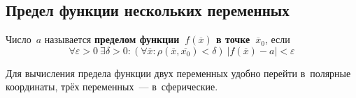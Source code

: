 \subsection{Предел функции нескольких переменных}
Число~$a$ называется \textbf{пределом функции~$f(\overline x)$ в точке~$\overline x_0$}, если
\begin{equation*}
\forall \varepsilon > 0 \ \exists \delta > 0 \colon (\forall \overline x \colon \rho(\overline x, \overline{x_0}) < \delta) \ |f(\overline x) - a| < \varepsilon
\end{equation*}

Для вычисления предела функции двух переменных удобно перейти в~полярные координаты, трёх переменных~--- в~сферические.